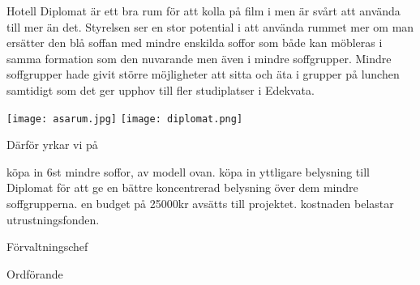 \documentclass[../_main/handlingar.tex]{subfiles}
\begin{document}

Hotell Diplomat är ett bra rum för att kolla på film i men är svårt att använda till mer än det. Styrelsen ser en stor potential i att använda rummet mer om man ersätter den blå soffan med mindre enskilda soffor som både kan möbleras i samma formation som den nuvarande men även i mindre soffgrupper. Mindre soffgrupper hade givit större möjligheter att sitta och äta i grupper på lunchen samtidigt som det ger upphov till fler studiplatser i Edekvata.

\begin{center}
\texttt{[image: asarum.jpg]}
\texttt{[image: diplomat.png]}
\end{center}

Därför yrkar vi på
\begin{attsatser}
    \att köpa in 6st mindre soffor, av modell ovan.
    \att köpa in yttligare belysning till Diplomat för att ge en bättre koncentrerad belysning över dem mindre soffgrupperna.
    \att en budget på 25000kr avsätts till projektet.
    \att kostnaden belastar utrustningsfonden.
\end{attsatser}

\begin{signatures}{2}
    \ist
    \signature{Anders Nilsson}{Förvaltningschef}
    \signature{\ordf}{Ordförande}
\end{signatures}
\end{document}
